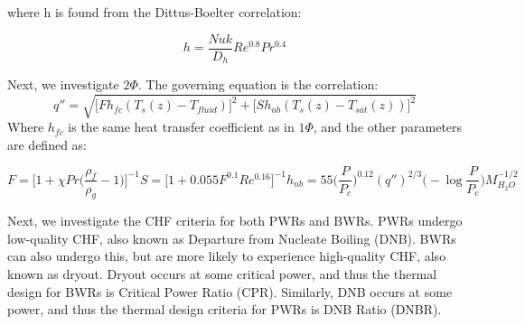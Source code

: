 \documentclass{article}
\begin{document}
where h is found from the Dittus-Boelter correlation:

\begin{equation}
    h = \frac{Nuk}{D_h}Re^{0.8}Pr^{0.4}
\end{equation}

Next, we investigate $2\Phi$. The governing equation is the correlation:
\begin{equation}
    q'' = \sqrt{\bigr[ Fh_{fc}(T_s(z) - T_{fluid})\bigr]^2 + \bigr[ Sh_{nb}(T_s(z) - T_{sat}(z))\bigr]^2} 
    \label{2phase}
\end{equation}
Where $h_{fc}$ is the same heat transfer coefficient as in $1\Phi$, and the other parameters are defined as:

\begin{subequations}
    \begin{equation}
        F = \biggr[ 1 + \chi Pr\biggr(\frac{\rho_f}{\rho_g} - 1\biggr)\biggr] ^{-1}
    \end{equation}  
    \begin{equation}
        S = \bigr[1 + 0.055F^{0.1}Re^{0.16}\bigr]^{-1}
    \end{equation}
    \begin{equation}
        h_{nb} = 55 \biggr(\frac{P}{P_c}\biggr)^{0.12}(q'')^{2/3}\biggr(-\log\frac{P}{P_c}\biggr)M_{H_2O}^{-1/2}
        \label{eq:hnb}
    \end{equation}
\end{subequations}

Next, we investigate the CHF criteria for both PWRs and BWRs. PWRs undergo low-quality CHF, also known as Departure from Nucleate Boiling (DNB). BWRs can also undergo this, but are more likely to experience high-quality CHF, also known as dryout. Dryout occurs at some critical power, and thus the thermal design for BWRs is Critical Power Ratio (CPR). Similarly, DNB occurs at some power, and thus the thermal design criteria for PWRs is DNB Ratio (DNBR). 
\end{document}
